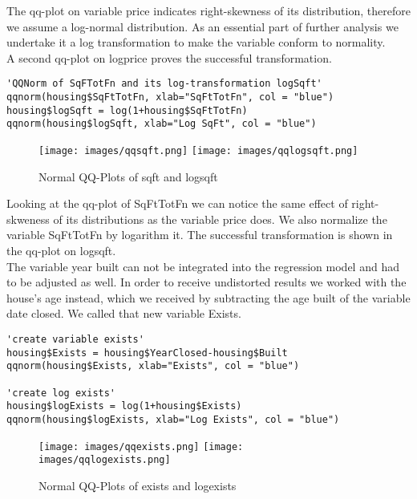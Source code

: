 The qq-plot on variable price indicates right-skewness of its distribution, therefore we assume a log-normal distribution. As an essential part of further analysis we undertake it a log transformation to make the variable conform to normality.\\
A second qq-plot on logprice proves the successful transformation.\\

\begin{lstlisting}[frame = single,backgroundcolor=\color{hellgelb}]
'QQNorm of SqFTotFn and its log-transformation logSqft'
qqnorm(housing$SqFtTotFn, xlab="SqFtTotFn", col = "blue") 
housing$logSqft = log(1+housing$SqFtTotFn)
qqnorm(housing$logSqft, xlab="Log SqFt", col = "blue")
\end{lstlisting}

\begin{figure}[ht]
\centering
	\texttt{[image: images/qqsqft.png]}
	\texttt{[image: images/qqlogsqft.png]}
	\caption{Normal QQ-Plots of sqft and logsqft}
\label{}
\end{figure}

Looking at the qq-plot of SqFtTotFn we can notice the same effect of right-skweness of its distributions as the variable price does. We also normalize the variable SqFtTotFn by logarithm it. The successful transformation is shown in the qq-plot on logsqft. \\

The variable year built can not be integrated into the regression model and had to be adjusted as well. In order to receive undistorted results we worked with the house's age instead, which we received by subtracting the age built of the variable date closed. We called that new variable Exists.

\begin{lstlisting}[frame = single,backgroundcolor=\color{hellgelb}]
'create variable exists'
housing$Exists = housing$YearClosed-housing$Built
qqnorm(housing$Exists, xlab="Exists", col = "blue")

'create log exists'
housing$logExists = log(1+housing$Exists)
qqnorm(housing$logExists, xlab="Log Exists", col = "blue")
\end{lstlisting}

\begin{figure}[ht]
\centering
	\texttt{[image: images/qqexists.png]}
	\texttt{[image: images/qqlogexists.png]}
	\caption{Normal QQ-Plots of exists and logexists}
\label{}
\end{figure}

